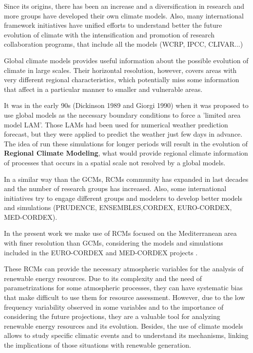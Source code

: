 Since its origins, there has been an increase and a diversification in research and more groups have developed their own climate models. Also, many international framework initiatives have unified efforts to understand better the future evolution of climate with the intensification and promotion of research collaboration programs, that include all the models (WCRP, IPCC, CLIVAR...)   

Global climate models provides useful information about the possible evolution of climate in large scales. Their horizontal resolution, however, covers areas with very different regional characteristics, which potentially miss some information that affect in a particular manner to smaller and vulnerable areas.

It was in the early 90s (Dickinson 1989 and Giorgi 1990) when it was proposed to use global models as the necessary boundary conditions to force a 'limited area model LAM'. Those LAMs had been used for numerical weather prediction forecast, but they were applied to predict the weather just few days in advance. The idea of run these simulations for longer periods will result in the evolution of \textbf{Regional Climate Modeling}, what would provide regional climate information of processes that occurs in a spatial scale not resolved by a global models.

In a similar way than the GCMs, RCMs community has expanded in last decades and the number of research groups has increased. Also, some international initiatives try to engage different groups and modelers to develop better models and simulations (PRUDENCE, ENSEMBLES,CORDEX, EURO-CORDEX, MED-CORDEX).

In the present work we make use of RCMs focused on the Mediterranean area with finer resolution than GCMs, considering the models and simulations included in the EURO-CORDEX and MED-CORDEX projects \cite*{Jacob2010, Ruti2016}.

These RCMs can provide the necessary atmospheric variables for the analysis of renewable energy resources. Due to its complexity and the need of parametrizations for some atmospheric processes, they can have systematic bias that make difficult to use them for resource assessment. However, due to the low frequency variability observed in some variables and to the importance of considering the future projections, they are a valuable tool for analyzing renewable energy resources and its evolution. Besides, the use of climate models allows to study specific climatic events and to understand its mechanisms, linking the implications of those situations with renewable generation.


